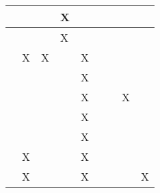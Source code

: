 \begin{longtable}{|l|llllllll|}
    \cite[]{fang.2019}            & \multicolumn{1}{l|}{}   & \multicolumn{1}{l|}{}    & \multicolumn{1}{l|}{X}   & \multicolumn{1}{l|}{}   & \multicolumn{1}{l|}{}   & \multicolumn{1}{l|}{}   & \multicolumn{1}{l|}{}   & \multicolumn{1}{l|}{}      \\ \hline
    \cite[]{Ashwin.2020}          & \multicolumn{1}{l|}{}   & \multicolumn{1}{l|}{}    & \multicolumn{1}{l|}{X}   & \multicolumn{1}{l|}{}   & \multicolumn{1}{l|}{}   & \multicolumn{1}{l|}{}   & \multicolumn{1}{l|}{}   & \multicolumn{1}{l|}{}      \\ \hline
    \cite[]{Schuderer.2021}       & \multicolumn{1}{l|}{X}   & \multicolumn{1}{l|}{X}    & \multicolumn{1}{l|}{}  & \multicolumn{1}{l|}{X}   & \multicolumn{1}{l|}{}   & \multicolumn{1}{l|}{}   & \multicolumn{1}{l|}{}   & \multicolumn{1}{l|}{}      \\ \hline
    \cite[]{Korber.2021}          & \multicolumn{1}{l|}{}   & \multicolumn{1}{l|}{}    & \multicolumn{1}{l|}{}  & \multicolumn{1}{l|}{X}   & \multicolumn{1}{l|}{}   & \multicolumn{1}{l|}{}   & \multicolumn{1}{l|}{}   & \multicolumn{1}{l|}{}      \\ \hline
    \cite[]{Bharadhwaj.2019}      & \multicolumn{1}{l|}{}   & \multicolumn{1}{l|}{}    & \multicolumn{1}{l|}{}  & \multicolumn{1}{l|}{X}   & \multicolumn{1}{l|}{}   & \multicolumn{1}{l|}{}   & \multicolumn{1}{l|}{X}   & \multicolumn{1}{l|}{}      \\ \hline
    \cite[]{Foronda.2021}         & \multicolumn{1}{l|}{}   & \multicolumn{1}{l|}{}    & \multicolumn{1}{l|}{}  & \multicolumn{1}{l|}{X}   & \multicolumn{1}{l|}{}   & \multicolumn{1}{l|}{}   & \multicolumn{1}{l|}{}   & \multicolumn{1}{l|}{}      \\ \hline
    \cite[]{Maria.1997}           & \multicolumn{1}{l|}{}   & \multicolumn{1}{l|}{}    & \multicolumn{1}{l|}{}  & \multicolumn{1}{l|}{X}   & \multicolumn{1}{l|}{}   & \multicolumn{1}{l|}{}   & \multicolumn{1}{l|}{}   & \multicolumn{1}{l|}{}      \\ \hline
    \cite[]{Brockman.2016}        & \multicolumn{1}{l|}{X}   & \multicolumn{1}{l|}{}    & \multicolumn{1}{l|}{}  & \multicolumn{1}{l|}{X}   & \multicolumn{1}{l|}{}   & \multicolumn{1}{l|}{}   & \multicolumn{1}{l|}{}   & \multicolumn{1}{l|}{}      \\ \hline
    \cite[]{YanDuan.2016}         & \multicolumn{1}{l|}{X}   & \multicolumn{1}{l|}{}    & \multicolumn{1}{l|}{}  & \multicolumn{1}{l|}{X}   & \multicolumn{1}{l|}{}   & \multicolumn{1}{l|}{}   & \multicolumn{1}{l|}{}   & \multicolumn{1}{l|}{X}      \\ \hline

\end{longtable}
